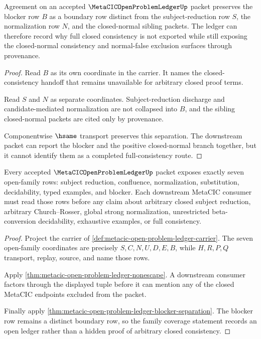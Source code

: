 \begin{theorem}
\label{thm:metacic-open-problem-ledger-blocker-separation}
Agreement on an accepted $\MetaCICOpenProblemLedgerUp$ packet preserves the blocker row $B$ as a boundary row distinct from the subject-reduction row $S$, the normalization row $N$, and the closed-normal sibling packets. The ledger can therefore record why full closed consistency is not exported while still exposing the closed-normal consistency and normal-false exclusion surfaces through provenance.
\end{theorem}
\begin{proof}
Read $B$ as its own coordinate in the carrier. It names the closed-consistency handoff that remains unavailable for arbitrary closed proof terms.

Read $S$ and $N$ as separate coordinates. Subject-reduction discharge and candidate-mediated normalization are not collapsed into $B$, and the sibling closed-normal packets are cited only by provenance.

Componentwise $\hsame$ transport preserves this separation. The downstream packet can report the blocker and the positive closed-normal branch together, but it cannot identify them as a completed full-consistency route.
\end{proof}

\begin{theorem}
\label{thm:metacic-open-problem-ledger-family-coverage}
Every accepted $\MetaCICOpenProblemLedgerUp$ packet exposes exactly seven open-family rows: subject reduction, confluence, normalization, substitution, decidability, typed examples, and blocker. Each downstream MetaCIC consumer must read those rows before any claim about arbitrary closed subject reduction, arbitrary Church--Rosser, global strong normalization, unrestricted beta-conversion decidability, exhaustive examples, or full consistency.
\end{theorem}
\begin{proof}
Project the carrier of \autoref{def:metacic-open-problem-ledger-carrier}. The seven open-family coordinates are precisely $S,C,N,U,D,E,B$, while $H,R,P,Q$ transport, replay, source, and name those rows.

Apply \autoref{thm:metacic-open-problem-ledger-nonescape}. A downstream consumer factors through the displayed tuple before it can mention any of the closed MetaCIC endpoints excluded from the packet.

Finally apply \autoref{thm:metacic-open-problem-ledger-blocker-separation}. The blocker row remains a distinct boundary row, so the family coverage statement records an open ledger rather than a hidden proof of arbitrary closed consistency.
\end{proof}

